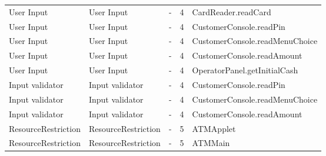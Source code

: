 \begin{table}
\begin{center}
\begin{tabular}{p{3.5cm}p{3.5cm}p{3.5cm}ll}
\rowcolor{RowColor}
User Input                               & User Input                           & -                                                                                                              & 4                   & CardReader.readCard            \\
User Input                               & User Input                           & -                                                                                                              & 4                   & CustomerConsole.readPin        \\
\rowcolor{RowColor}
User Input                               & User Input                           & -                                                                                                              & 4                   & CustomerConsole.readMenuChoice \\
User Input                               & User Input                           & -                                                                                                              & 4                   & CustomerConsole.readAmount     \\
\rowcolor{RowColor}
User Input                               & User Input                           & -                                                                                                              & 4                   & OperatorPanel.getInitialCash   \\
Input validator                          & Input validator                      & -                                                                                                              & 4                   & CustomerConsole.readPin        \\
\rowcolor{RowColor}
Input validator                          & Input validator                      & -                                                                                                              & 4                   & CustomerConsole.readMenuChoice \\
Input validator                          & Input validator                      & -                                                                                                              & 4                   & CustomerConsole.readAmount     \\
\rowcolor{RowColor}
ResourceRestriction                      & ResourceRestriction                  & -                                                                                                              & 5                   & ATMApplet                                   \\
ResourceRestriction                      & ResourceRestriction                  & -                                                                                                              & 5                   & ATMMain  \\
\hline
\end{tabular}
\end{center}
\end{table}

